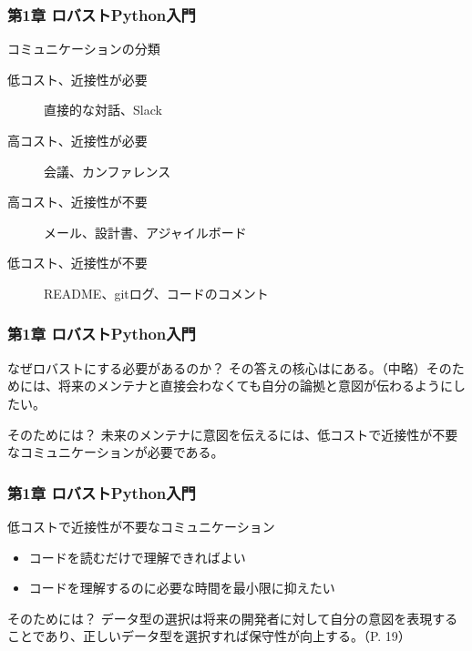 \documentclass[aspectratio=169,dvipdfmx,14pt,notheorems]{beamer}
\theoremstyle{definition}
\begin{document}
\begin{frame}\frametitle{第1章 ロバストPython入門}

\begin{block}{コミュニケーションの分類}
\begin{description}
\item[低コスト、近接性が必要] 直接的な対話、Slack
\item[高コスト、近接性が必要] 会議、カンファレンス
\item[高コスト、近接性が不要] メール、設計書、アジャイルボード
\item[低コスト、近接性が不要] README、gitログ、コードのコメント
\end{description}
\end{block}
\end{frame}

\begin{frame}\frametitle{第1章 ロバストPython入門}

\begin{block}{なぜロバストにする必要があるのか？}
その答えの核心はにある。（中略）そのためには、将来のメンテナと直接会わなくても自分の論拠と意図が伝わるようにしたい。
\end{block}

\begin{block}{そのためには？}
未来のメンテナに意図を伝えるには、低コストで近接性が不要なコミュニケーションが必要である。
\end{block}

\end{frame}

\begin{frame}\frametitle{第1章 ロバストPython入門}

\begin{block}{低コストで近接性が不要なコミュニケーション}
\begin{itemize}
\item コードを読むだけで理解できればよい
\item コードを理解するのに必要な時間を最小限に抑えたい
\end{itemize}

\end{block}

\begin{block}{そのためには？}
データ型の選択は将来の開発者に対して自分の意図を表現することであり、正しいデータ型を選択すれば保守性が向上する。（P. 19）
\end{block}

\end{frame}
\end{document}
